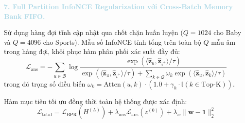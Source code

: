 \noindent\textcolor{lightblue}{\textbf{7. Full Partition InfoNCE Regularization với Cross-Batch Memory Bank FIFO.}}

Sử dụng hàng đợi tĩnh cập nhật qua chốt chặn huấn luyện ($Q=1024$ cho Baby và $Q=4096$ cho Sports). Mẫu số InfoNCE tính tổng trên toàn bộ $Q$ mẫu âm trong hàng đợi, khôi phục hàm phân phối xác suất đầy đủ:
\begin{equation}
\mathcal{L}_{\text{ans}} = -\sum_{u \in \mathcal{B}} \log \frac{\exp(\langle \hat{\mathbf{z}}_u, \hat{\mathbf{z}}_{i^+} \rangle / \tau)}{\exp(\langle \hat{\mathbf{z}}_u, \hat{\mathbf{z}}_{i^+} \rangle / \tau) + \sum_{k \in \mathcal{Q}} \omega_k \exp(\langle \hat{\mathbf{z}}_u, \hat{\mathbf{z}}_k \rangle / \tau)}
\end{equation}
trong đó trọng số điều biến $\omega_k = \text{Atten}(u, k) \cdot (1.0 + \gamma_h \cdot \mathbb{I}(k \in \text{Top-K}))$.

Hàm mục tiêu tối ưu đồng thời toàn hệ thống được xác định:
\begin{equation}
\mathcal{L}_{\text{total}} = \mathcal{L}_{\text{BPR}}(H^{(L)}) + \lambda_{\text{ans}} \mathcal{L}_{\text{ans}}(z^{(0)}) + \lambda_w \|\mathbf{w} - \mathbf{1}\|_2^2
\end{equation}

